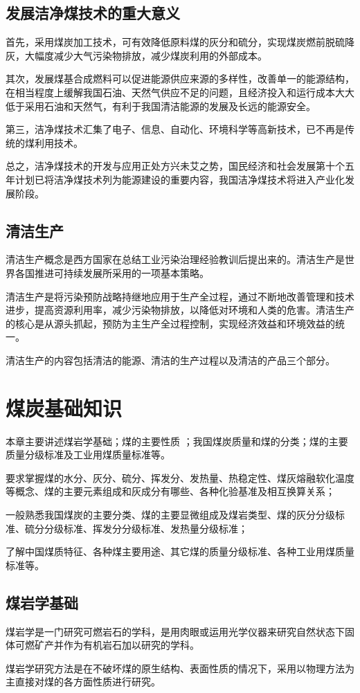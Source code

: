 \documentclass[10pt,openany]{ctexbook}
\begin{document}
\section{发展洁净煤技术的重大意义}
首先，采用煤炭加工技术，可有效降低原料煤的灰分和硫分，实现煤炭燃前脱硫降灰，大幅度减少大气污染物排放，减少煤炭利用的外部成本。\par
   其次，发展煤基合成燃料可以促进能源供应来源的多样性，改善单一的能源结构，在相当程度上缓解我国石油、天然气供应不足的问题，且经济投入和运行成本大大低于采用石油和天然气，有利于我国清洁能源的发展及长远的能源安全。\par
   第三，洁净煤技术汇集了电子、信息、自动化、环境科学等高新技术，已不再是传统的煤利用技术。\par
   总之，洁净煤技术的开发与应用正处方兴未艾之势，国民经济和社会发展第十个五年计划已将洁净煤技术列为能源建设的重要内容，我国洁净煤技术将进入产业化发展阶段。
\section{清洁生产 }
清洁生产概念是西方国家在总结工业污染治理经验教训后提出来的。清洁生产是世界各国推进可持续发展所采用的一项基本策略。\par
    清洁生产是将污染预防战略持继地应用于生产全过程，通过不断地改善管理和技术进步，提高资源利用率，减少污染物排放，以降低对环境和人类的危害。清洁生产的核心是从源头抓起，预防为主生产全过程控制，实现经济效益和环境效益的统一。\par
    清洁生产的内容包括清洁的能源、清洁的生产过程以及清洁的产品三个部分。 \par
\chapter{煤炭基础知识}
      本章主要讲述煤岩学基础；煤的主要性质 ；我国煤炭质量和煤的分类；煤的主要质量分级标准及工业用煤质量标准等。\par
  要求掌握煤的水分、灰分、硫分、挥发分、发热量、热稳定性、煤灰熔融软化温度等概念、煤的主要元素组成和灰成分有哪些、各种化验基准及相互换算关系；\par
 一般熟悉我国煤炭的主要分类、煤的主要显微组成及煤岩类型、煤的灰分分级标准、硫分分级标准、挥发分分级标准、发热量分级标准；\par
  了解中国煤质特征、各种煤主要用途、其它煤的质量分级标准、各种工业用煤质量标准等。\par
\section{煤岩学基础}
  煤岩学是一门研究可燃岩石的学科，是用肉眼或运用光学仪器来研究自然状态下固体可燃矿产并作为有机岩石加以研究的学科。\par
 煤岩学研究方法是在不破坏煤的原生结构、表面性质的情况下，采用以物理方法为主直接对煤的各方面性质进行研究。
\end{document}
